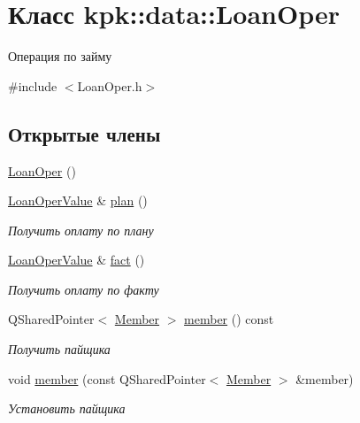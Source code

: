 \hypertarget{classkpk_1_1data_1_1_loan_oper}{}\section{Класс kpk\+:\+:data\+:\+:Loan\+Oper}
\label{classkpk_1_1data_1_1_loan_oper}


Операция по займу  




{\ttfamily \#include $<$Loan\+Oper.\+h$>$}

\subsection*{Открытые члены}
\begin{DoxyCompactItemize}
\item 
\hyperlink{classkpk_1_1data_1_1_loan_oper_ab4c52cd423192f6d8a14bac56917e8cb}{Loan\+Oper} ()
\item 
\hyperlink{classkpk_1_1data_1_1_loan_oper_value}{Loan\+Oper\+Value} \& \hyperlink{classkpk_1_1data_1_1_loan_oper_af20e426695913f8593131a65014b29b4}{plan} ()
\begin{DoxyCompactList}\small\item\em Получить оплату по плану \end{DoxyCompactList}\item 
\hyperlink{classkpk_1_1data_1_1_loan_oper_value}{Loan\+Oper\+Value} \& \hyperlink{classkpk_1_1data_1_1_loan_oper_afab5ad2be6f0207bce3c61e2b6ea8f40}{fact} ()
\begin{DoxyCompactList}\small\item\em Получить оплату по факту \end{DoxyCompactList}\item 
Q\+Shared\+Pointer$<$ \hyperlink{classkpk_1_1data_1_1_member}{Member} $>$ \hyperlink{classkpk_1_1data_1_1_loan_oper_a284dc401e5e3707dc6b527a2319c48be}{member} () const 
\begin{DoxyCompactList}\small\item\em Получить пайщика \end{DoxyCompactList}\item 
void \hyperlink{classkpk_1_1data_1_1_loan_oper_a729594b0f6ae32a9e847fd6d96300f1a}{member} (const Q\+Shared\+Pointer$<$ \hyperlink{classkpk_1_1data_1_1_member}{Member} $>$ \&member)
\begin{DoxyCompactList}\small\item\em Установить пайщика \end{DoxyCompactList}\item 

\end{DoxyCompactItemize}
